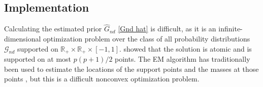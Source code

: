 \documentclass[useAMS,referee,usenatbib]{biom}
\begin{document}
\subsection{\label{implementation}Implementation}

Calculating the estimated prior $\hat{G}_{nd}$ \eqref{Gnd hat} is difficult, as it is an infinite-dimensional optimization problem over the class of all probability distributions $\mathcal{G}_{nd}$ supported on $\mathbb{R}_+ \times \mathbb{R}_+ \times [-1, 1]$. \citet{lindsay1983geometry} showed that the solution is atomic and is supported on at most $p(p+1)/2$ points. The EM algorithm has traditionally been used to estimate the locations of the support points and the masses at those points \citep{laird1978nonparametric}, but this is a difficult nonconvex optimization problem.
\end{document}
